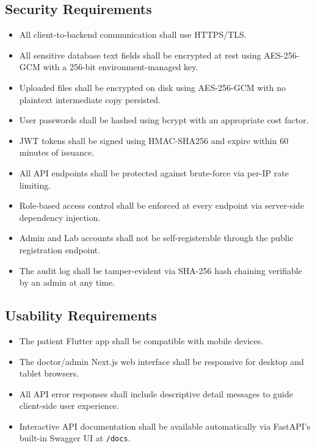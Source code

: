 \documentclass[a4paper,12pt]{report}
\begin{document}
\subsection{Security Requirements}
\begin{itemize}
    \item All client-to-backend communication shall use HTTPS/TLS.
    \item All sensitive database text fields shall be encrypted at rest using AES-256-GCM with a 256-bit environment-managed key.
    \item Uploaded files shall be encrypted on disk using AES-256-GCM with no plaintext intermediate copy persisted.
    \item User passwords shall be hashed using bcrypt with an appropriate cost factor.
    \item JWT tokens shall be signed using HMAC-SHA256 and expire within 60 minutes of issuance.
    \item All API endpoints shall be protected against brute-force via per-IP rate limiting.
    \item Role-based access control shall be enforced at every endpoint via server-side dependency injection.
    \item Admin and Lab accounts shall not be self-registerable through the public registration endpoint.
    \item The audit log shall be tamper-evident via SHA-256 hash chaining verifiable by an admin at any time.
\end{itemize}

\subsection{Usability Requirements}
\begin{itemize}
    \item The patient Flutter app shall be compatible with mobile devices.
    \item The doctor/admin Next.js web interface shall be responsive for desktop and tablet browsers.
    \item All API error responses shall include descriptive detail messages to guide client-side user experience.
    \item Interactive API documentation shall be available automatically via FastAPI's built-in Swagger UI at \texttt{/docs}.
\end{itemize}
\end{document}
